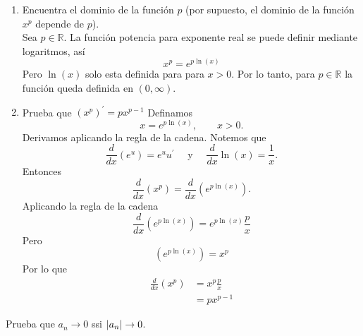 \documentclass[12pt,a4paper]{article}
\begin{document}
    \begin{solucion}
        \begin{enumerate}
            \item[(a)] Encuentra el dominio de la función $p$ (por supuesto, el dominio de la
            función $x^{p}$ depende de $p$).\\
            Sea $p\in\mathbb{R}$. La función potencia para exponente real se
            puede definir mediante logaritmos, así
            \begin{equation*}
                x^{p}=e^{p\ln(x)}
            \end{equation*}
            Pero $\ln(x)$ solo esta definida para para $x\gt0$. Por lo tanto,
            para $p\in\mathbb{R}$ la función queda definida en $(0,\infty)$.
            \item[(b)] Prueba que $(x^{p})^{\prime}=px^{p-1}$
            Definamos
            \begin{equation*}
                x=e^{p\ln(x)},\qquad x\gt0.
            \end{equation*}
            Derivamos aplicando la regla de la cadena. Notemos que
            \begin{equation*}
                \frac{d}{dx}(e^{u})=e^{u}u^{\prime}\quad\text{ y }\quad \frac{d}{dx}\ln(x)=\frac{1}{x}.
            \end{equation*}
            Entonces
            \begin{equation*}
                \frac{d}{dx}(x^{p})=\frac{d}{dx}(e^{p\ln(x)}).
            \end{equation*}
            Aplicando la regla de la cadena
            \begin{equation*}
                \frac{d}{dx}(e^{p\ln(x)})=e^{p\ln(x)}\frac{p}{x}
            \end{equation*}
            Pero
            \begin{equation*}
                (e^{p\ln(x)})=x^{p}
            \end{equation*}
            Por lo que
            \begin{align*}
                \frac{d}{dx}(x^{p})&=x^{p}\frac{p}{x}\\
                &=px^{p-1}
            \end{align*}
        \end{enumerate}
    \end{solucion}

    \begin{mdframed}[style=mdbluebox,frametitle={Ejercicio 8}]
        Prueba que $a_{n}\to0$ ssi $\abs{a_{n}}\to0$.
    \end{mdframed}
\end{document}
